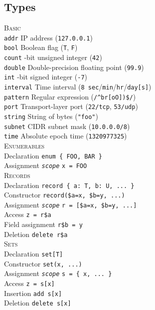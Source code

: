 \documentclass[10pt,landscape]{article}
\newcommand{\minisec}[1]{\textsc{#1}\\}
\begin{document}
\begin{multicols*}{3}
\subsection*{Types}

\minisec{Basic}
\verb|addr| \dotfill IP address (\verb|127.0.0.1|)\\
\verb|bool| \dotfill Boolean flag (\verb|T|, \verb|F|)\\
\verb|count| -bit unsigned integer (\verb|42|)\\
\verb|double| \dotfill Double-precision floating point (\verb|99.9|)\\
\verb|int| -bit signed integer (\verb|-7|)\\
\verb|interval| \dotfill Time interval
  (\verb|8 sec|/\verb|min|/\verb|hr|/\verb|day[s]|)\\
\verb|pattern| \dotfill Regular expression (\verb|/^br[oO])$/|)\\
\verb|port| \dotfill Transport-layer port
  (\verb|22/tcp|, \verb|53/udp|)\\
\verb|string| \dotfill String of bytes (\verb|"foo"|)\\
\verb|subnet| \dotfill CIDR subnet mask (\verb|10.0.0.0/8|)\\
\verb|time| \dotfill Absolute epoch time (\verb|1320977325|)\\

\minisec{Enumerables}
Declaration \dotfill \verb|enum { FOO, BAR }|\\
Assignment \dotfill \texttt{\textit{scope}} \verb|x = FOO|\\

\minisec{Records}
Declaration \dotfill \verb|record { a: T, b: U, ... }|\\
Constructor \dotfill \verb|record($a=x, $b=y, ...)|\\
Assignment \dotfill \texttt{\textit{scope}} \verb|r = [$a=x, $b=y, ...]|\\
Access \dotfill \verb|z = r$a|\\
Field assignment \dotfill \verb|r$b = y|\\
Deletion \dotfill \verb|delete r$a|\\

\minisec{Sets}
Declaration \dotfill \verb|set[T]|\\
Constructor \dotfill \verb|set(x, ...)|\\
Assignment \dotfill \texttt{\textit{scope}} \verb|s = { x, ... }|\\
Access \dotfill \verb|z = s[x]|\\
Insertion \dotfill \verb|add s[x]|\\
Deletion \dotfill \verb|delete s[x]|\\


\end{multicols*}
\end{document}
